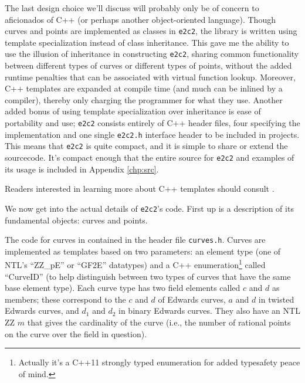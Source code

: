 
The last design choice we'll discuss will probably only be of concern to
    aficionados of C++ (or perhaps another object-oriented language).
Though curves and points are implemented as classes in \texttt{e2c2}, the
    library is written using template specialization instead of class
    inheritance.
This gave me the ability to use the illusion of inheritance in constructing
    \texttt{e2c2}, sharing common functionality between different types of
    curves or different types of points, without the added runtime penalties
    that can be associated with virtual function lookup.
Moreover, C++ templates are expanded at compile time (and much can be inlined
    by a compiler), thereby only charging the programmer for what they use.
Another added bonus of using template specialization over inheritance is ease
    of portability and use; \texttt{e2c2} consists entirely of C++ header
    files, four specifying the implementation and one single \texttt{e2c2.h}
    interface header to be included in projects.
This means that \texttt{e2c2} is quite compact, and it is simple to share or
    extend the sourcecode.
It's compact enough that the entire source for \texttt{e2c2} and examples of
    its usage is included in Appendix \ref{chp:src}.

Readers interested in learning more about C++ templates should consult
    \cite{stroustrup1997c++}.


We now get into the actual details of \texttt{e2c2}'s code.
First up is a description of its fundamental objects: curves and points.


The code for curves in contained in the header file \texttt{curves.h}.
Curves are implemented as templates based on two parameters: an element type
    (one of NTL's ``ZZ\_pE'' or ``GF2E'' datatypes) and a C++
    enumeration\footnote{Actually it's a C++11 strongly typed enumeration for
    added typesafety peace of mind.} called ``CurveID'' (to help distinguish
    between two types of curves that have the same base element type).
Each curve type has two field elements called $c$ and $d$ as members; these
    correspond to the $c$ and $d$ of Edwards curves, $a$ and $d$ in twisted
    Edwards curves, and $d_1$ and $d_2$ in binary Edwards curves.
They also have an NTL ZZ $m$ that gives the cardinality of the curve (i.e., the
    number of rational points on the curve over the field in question).

